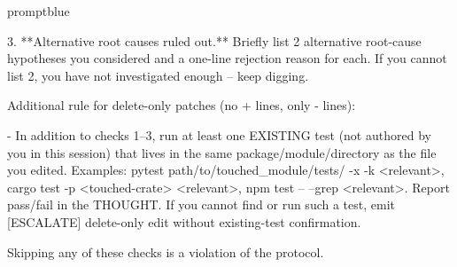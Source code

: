 \begin{promptbox}{promptblue}
{3. **Alternative root causes ruled out.** Briefly list 2 alternative root-cause hypotheses you considered and a one-line rejection reason for each. If you cannot list 2, you have not investigated enough -- keep digging.\par
\vspace{0.35em}\par
Additional rule for delete-only patches (no \textasciigrave{}+\textasciigrave{} lines, only \textasciigrave{}-\textasciigrave{} lines):\par
- In addition to checks 1--3, run at least one EXISTING test (not authored by you in this session) that lives in the same package/module/directory as the file you edited. Examples: \textasciigrave{}pytest path/to/touched\_module/tests/ -x -k \textless{}relevant\textgreater{}\textasciigrave{}, \textasciigrave{}cargo test -p \textless{}touched-crate\textgreater{} \textless{}relevant\textgreater{}\textasciigrave{}, \textasciigrave{}npm test -- --grep \textless{}relevant\textgreater{}\textasciigrave{}. Report pass/fail in the THOUGHT. If you cannot find or run such a test, emit \textasciigrave{}[ESCALATE] delete-only edit without existing-test confirmation\textasciigrave{}.\par
\vspace{0.35em}\par
Skipping any of these checks is a violation of the protocol.\par
}
\end{promptbox}

